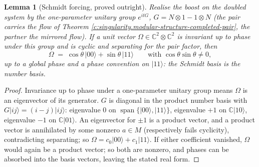 \documentclass[11pt]{article}
\newtheorem{lemma}[theorem]{Lemma}
\theoremstyle{definition}
\theoremstyle{plain}
\providecommand{\C}{}\renewcommand{\C}{\mathbb{C}}
\begin{document}
\begin{lemma}[Schmidt forcing, proved outright]\label{c:singularity.schmidt-forcing-proved-outright}
Realise the boost on the doubled system by the one-parameter unitary group $e^{i t G}$, $G = N \otimes 1 - 1 \otimes N$ (the pair carries the flow of Theorem \ref{c:singularity.modular-structure-completed-pair}, the partner the mirrored flow). If a unit vector $\Omega \in \C^2 \otimes \C^2$ is invariant up to phase under this group and is cyclic and separating for the pair factor, then
\[
\Omega \;=\; \cos\theta\,|00\rangle + \sin\theta\,|11\rangle \qquad \text{with } \cos\theta\sin\theta \neq 0 ,
\]
up to a global phase and a phase convention on $|11\rangle$: the Schmidt basis is the number basis.
\end{lemma}
\begin{proof}
Invariance up to phase under a one-parameter unitary group means $\Omega$ is an eigenvector of its generator. $G$ is diagonal in the product number basis with $G|ij\rangle = (i - j)|ij\rangle$: eigenvalue $0$ on $\operatorname{span}\{|00\rangle, |11\rangle\}$, eigenvalue $+1$ on $\C|10\rangle$, eigenvalue $-1$ on $\C|01\rangle$. An eigenvector for $\pm 1$ is a product vector, and a product vector is annihilated by some nonzero $a \in M$ (respectively fails cyclicity), contradicting separating; so $\Omega = c_0|00\rangle + c_1|11\rangle$. If either coefficient vanished, $\Omega$ would again be a product vector; so both are nonzero, and phases can be absorbed into the basis vectors, leaving the stated real form.

\end{proof}
\end{document}
